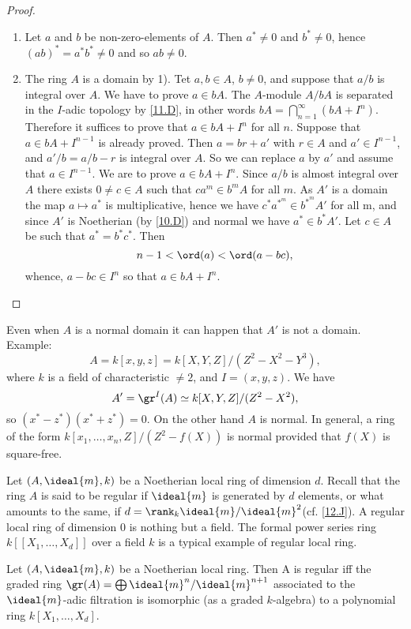 \documentclass[../main]{subfiles}
\begin{document}
\begin{proof}
    \begin{enumerate}
        \item Let $a$ and $b$ be non-zero-elements of $A$. Then $a^\ast \neq 0$ and $b^{\ast} \neq 0$, hence $(a b)^{\ast}=a^{\ast} b^\ast \neq 0$ and so $a b \neq 0$.
        \item The ring $A$ is a domain by 1). Tet $a, b \in A$, $b \neq 0$, and suppose that $a/b$ is integral over $A$. We have to prove $a \in bA$. The $A$-module $A/bA$ is separated in the $I$-adic topology by \ref{11.D}, in other words $b A=\bigcap_{n=1}^\infty(bA+I^n)$. Therefore it suffices to prove that $a \in bA +I^n$ for all $n$. Suppose that $a \in bA +I^{n-1}$ is already proved. Then $a=b r+a'$ with $r \in A$ and $a' \in I^{n-1}$, and $a' / b=a / b-r$ is integral over $A$. So we can replace $a$ by $a'$ and assume that $a \in I^{n-1}$. We are to prove $a \in bA+I^n$. Since $a/b$ is almost integral over $A$ there exists $0 \neq c \in A$ such that $c a^m \in b^m A$ for all $m$. As $A'$ is a domain the map $a \mapsto a^{\ast}$ is multiplicative, hence we have $c^{\ast} a^{\ast^m} \in b^{\ast^m} A'$ for all m, and since $A'$ is Noetherian (by \ref{10.D}) and normal we have $a^\ast\in b^\ast A'$. Let $c\in A$ be such that $a^\ast = b^\ast c^\ast$. Then \[n-1<\ord(a)<\ord(a-bc),\] whence, $a-bc\in I^n$ so that $a\in bA+I^n$.
    \end{enumerate}
\end{proof}
\begin{remark}
 Even when $A$ is a normal domain it can happen that $A'$ is not a domain. Example: \[A=k[x, y, z]=k[X, Y, Z] / (Z^2-X^2-Y^3),\] where $k$ is a field of characteristic $\neq 2$, and $I=(x, y, z)$. We have \[A'=\gr^I(A) \simeq k[X, Y, Z] /(Z^2-X^2),\] so $(x^{\ast}-z^{\ast})(x^{\ast}+z^{\ast})=0$. On the other hand $A$ is normal. In general, a ring of the form $k[x_1, \ldots, x_n, Z] /(Z^2-f(X))$ is normal provided that $f(X)$ is square-free.
\end{remark}

\newparagraph Let $(A,\ideal{m},k)$ be a Noetherian local ring of dimension $d$. Recall that the ring $A$ is said to be regular if $\ideal{m}$ is generated by $d$ elements, or what amounts to the same, if $d=\rank_k \ideal{m} / \ideal{m}^2$(cf. \ref{12.J}). A regular local ring of dimension $0$ is nothing but a field. The formal power series ring $k[[X_1, \dots, X_d]]$ over a field $k$ is a typical example of regular local ring.

\begin{theorem}\label{thm:035}
  Let $(A, \ideal{m}, k)$ be a Noetherian local ring. Then A is regular iff the graded ring $\gr(A)=\bigoplus \ideal{m}^n / \ideal{m}^{n+1}$ associated to the $\ideal{m}$-adic filtration is isomorphic (as a graded $k$-algebra) to a polynomial ring $k[X_1, \ldots, X_d]$.
\end{theorem}
\end{document}
